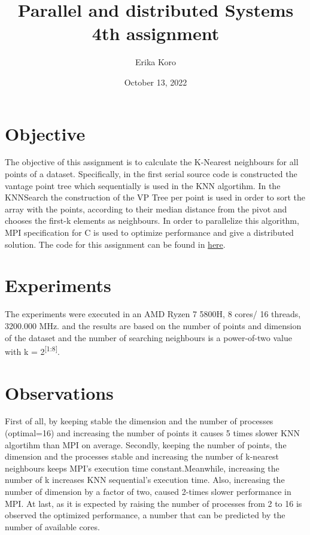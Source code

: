 \documentclass[12pt, a4paper]{report}
\title{\quad Parallel and distributed Systems 
        \newline 4th assignment}
\author{Erika Koro}
\date{October 13, 2022}
\begin{document}
    \maketitle

    \newpage 
    \section*{Objective}

    The objective of this assignment is to calculate the K-Nearest neighbours for all points of 
    a dataset. Specifically, in the first serial source code is constructed the vantage point
    tree which sequentially is used in the KNN algortihm. In the KNNSearch the construction of the
    VP Tree per point is used in order to sort the array with the points, according to their median distance
    from the pivot and chooses the first-k elements as neighbours.
    In order to parallelize this algorithm, MPI specification for C is used to optimize performance
    and give a distributed solution. The code for this assignment can be found
    in \href{https://github.com/ErikaKoro/PDS4}{here}.



    \section*{Experiments}
    
    The experiments were executed in an AMD Ryzen 7 5800H, 8 cores/ 16 threads, 3200.000 MHz.
    and the results are based on the number of points and dimension of the dataset and the 
    number of searching neighbours is a power-of-two value with k = 2\textsuperscript{[1:8]}. 


    \section*{Observations}

    First of all, by keeping stable the dimension and the number of processes (optimal=16) and increasing the
    number of points it causes 5 times slower KNN algortihm than MPI on average. Secondly, keeping the number of
    points, the dimension and the processes stable and increasing the number of k-nearest neighbours keeps MPI's
    execution time constant.Meanwhile, increasing the number of k increases KNN sequential's execution time. Also,
    increasing the number of dimension by a factor of two, caused 2-times slower performance in MPI. At last, as it is expected by raising the number of processes from 2 to 16 is observed the optimized
    performance, a number that can be predicted by the number of available cores. 
\end{document}
